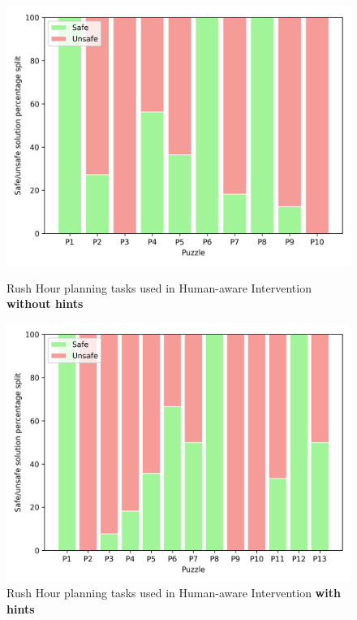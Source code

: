 \begin{figure}[tpb]
\centering
	\begin{minipage}[b]{0.45\columnwidth}
	\includegraphics[width=\columnwidth]{img/phase1split.png}
	\caption{Rush Hour planning tasks used in Human-aware Intervention \textbf{without hints}}				
	\label{fig:phase1split}
	\end{minipage}
	\quad
	\begin{minipage}[b]{0.45\columnwidth}
	\includegraphics[width=\columnwidth]{img/phase2split.png}
	\caption{Rush Hour planning tasks used in Human-aware Intervention \textbf{with hints}}
	\label{fig:phase2split}
	\end{minipage}
\end{figure}

